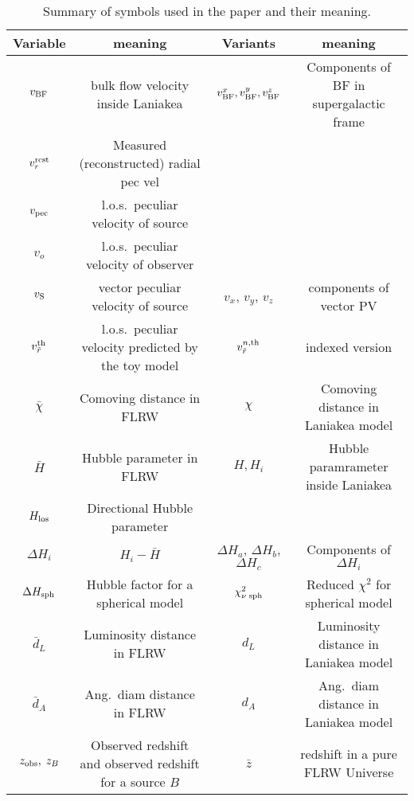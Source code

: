 \documentclass[notitlepage,nofootinbib]{revtex4-1}
\begin{document}
\begin{table}[h]
\centering
\begin{tabular}{c|c|c|c}
\hline
Variable & meaning & Variants & meaning \\
\hline
$v_{\rm BF}$ & bulk flow velocity inside Laniakea & $v_{\rm BF}^x, v_{\rm BF}^y, v_{\rm BF}^z$ & Components of BF in supergalactic frame \\
$v_r^{\rm rcst}$  & Measured (reconstructed) {\rm radial} pec vel &  &  \\
$v_{\rm pec}$ & l.o.s.\ peculiar velocity of source &  &  \\
$v_{o}$ & l.o.s.\ peculiar velocity of observer &  &  \\
$v_{\rm S}$ & vector peculiar velocity of source & $v_x$, $v_y$, $v_z$ & components of vector PV \\
$v_{\tilde{r}}^{\rm th}$ & l.o.s.\ peculiar velocity predicted by the toy model & $v_{\tilde{r}}^{n, {\rm th}}$ & indexed version\\
$\bar{\chi}$ & Comoving distance in FLRW & $\chi$ & Comoving distance in Laniakea model \\
$\bar{H}$ & Hubble parameter in FLRW & $H, H_i $ & Hubble paramrameter inside Laniakea\\
$H_{\rm{los}}$ & Directional Hubble parameter  &  & \\
$\Delta H_i$ & $H_i-\bar{H}$ & $\Delta H_a$, $\Delta H_b$, $\Delta H_c$ & Components of $\Delta H_i$\\
$\Delta H_{\rm sph}$ & Hubble factor for a spherical model & $\chi^2_{\nu\; \rm{sph} } $ & Reduced $\chi^2$ for spherical model \\
$\bar{d}_L$ & Luminosity distance in FLRW & $d_L$ & Luminosity distance in Laniakea model \\
$\bar{d}_A$ & Ang.\ diam distance in FLRW & $d_A$ & Ang.\ diam  distance in Laniakea model \\
$z_{\rm obs},\;z_B$ & Observed redshift and observed redshift for a source $B$ & $\bar{z}$& redshift in a pure FLRW Universe\\

\hline
\end{tabular}
\caption{Summary of symbols used in the paper and their meaning.}
\label{modelbestfits}
\end{table}

% 

\end{document}
